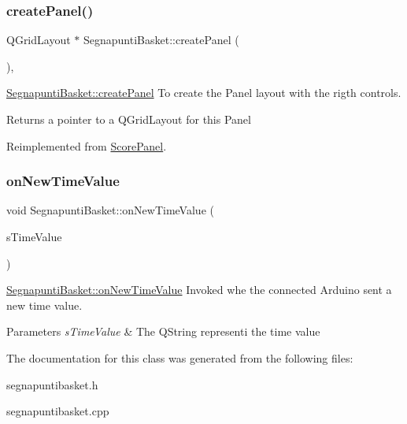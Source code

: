\subsubsection{\texorpdfstring{create\+Panel()}{createPanel()}}
{\footnotesize\ttfamily Q\+Grid\+Layout $\ast$ Segnapunti\+Basket\+::create\+Panel (\begin{DoxyParamCaption}{ }\end{DoxyParamCaption})\hspace{0.3cm}{\ttfamily [protected]}, {\ttfamily [virtual]}}



\mbox{\hyperlink{classSegnapuntiBasket_a4fd8f038194cbb70dd732babc6ab3dfa}{Segnapunti\+Basket\+::create\+Panel}} To create the Panel layout with the rigth controls. 

\begin{DoxyReturn}{Returns}
a pointer to a Q\+Grid\+Layout for this Panel 
\end{DoxyReturn}


Reimplemented from \mbox{\hyperlink{classScorePanel_aae4f1b7b8ee1afc61ac53105f8657fdb}{Score\+Panel}}.

\mbox{\label{classSegnapuntiBasket_a75e9d6be889a2c822e0aa3f13bc342a2}} 
\subsubsection{\texorpdfstring{on\+New\+Time\+Value}{onNewTimeValue}}
{\footnotesize\ttfamily void Segnapunti\+Basket\+::on\+New\+Time\+Value (\begin{DoxyParamCaption}\item[{Q\+String}]{s\+Time\+Value }\end{DoxyParamCaption})\hspace{0.3cm}{\ttfamily [slot]}}



\mbox{\hyperlink{classSegnapuntiBasket_a75e9d6be889a2c822e0aa3f13bc342a2}{Segnapunti\+Basket\+::on\+New\+Time\+Value}} Invoked whe the connected Arduino sent a new time value. 


\begin{DoxyParams}{Parameters}
{\em s\+Time\+Value} & The Q\+String representi the time value \\
\hline
\end{DoxyParams}


The documentation for this class was generated from the following files\+:\begin{DoxyCompactItemize}
\item 
segnapuntibasket.\+h\item 
segnapuntibasket.\+cpp\end{DoxyCompactItemize}

